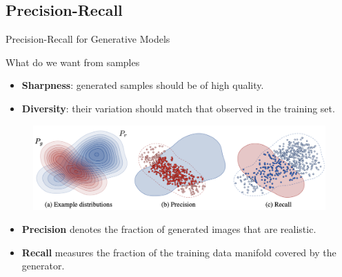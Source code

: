 \subsection{Precision-Recall}
\begin{frame}{Precision-Recall for Generative Models}
	\begin{block}{What do we want from samples}
		\begin{itemize}
			\item \textbf{Sharpness}: generated samples should be of high quality.
			\item \textbf{Diversity}: their variation should match that observed in the training set.
		\end{itemize}
	\end{block}
	\vspace{-0.5cm}
	\begin{figure}
		\includegraphics[width=0.95\linewidth]{figs/pr_curve}
	\end{figure}
	\vspace{-0.3cm}
	\begin{itemize}
		\item \textbf{Precision} denotes the fraction of generated images that are realistic.
		\item \textbf{Recall} measures the fraction of the training data manifold covered by the generator.
	\end{itemize}
\end{frame}
